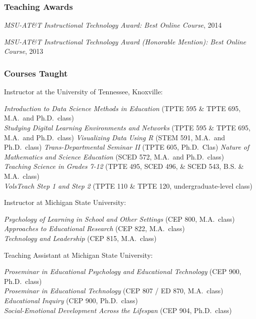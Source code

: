 \documentclass[
  14,
]{article}
\begin{document}
\hypertarget{teaching-awards}{%
\subsubsection{Teaching Awards}\label{teaching-awards}}

\emph{MSU-AT\&T Instructional Technology Award: Best Online Course},
2014

\emph{MSU-AT\&T Instructional Technology Award (Honorable Mention): Best
Online Course}, 2013

\hypertarget{courses-taught}{%
\subsubsection{Courses Taught}\label{courses-taught}}

Instructor at the University of Tennessee, Knoxville:

\emph{Introduction to Data Science Methods in Education} (TPTE 595 \&
TPTE 695, M.A.~and Ph.D.~class)\\
\emph{Studying Digital Learning Environments and Networks} (TPTE 595 \&
TPTE 695, M.A.~and Ph.D.~class) \emph{Visualizing Data Using R} (STEM
591, M.A.~and Ph.D.~class) \emph{Trans-Departmental Seminar II} (TPTE
605, Ph.D.~Clas) \emph{Nature of Mathematics and Science Education}
(SCED 572, M.A.~and Ph.D.~class)\\
\emph{Teaching Science in Grades 7-12} (TPTE 495, SCED 496, \& SCED 543,
B.S. \& M.A.~class)\\
\emph{VolsTeach Step 1 and Step 2} (TPTE 110 \& TPTE 120,
undergraduate-level class)

Instructor at Michigan State University:

\emph{Psychology of Learning in School and Other Settings} (CEP 800,
M.A.~class)\\
\emph{Approaches to Educational Research} (CEP 822, M.A.~class)\\
\emph{Technology and Leadership} (CEP 815, M.A.~class)

Teaching Assistant at Michigan State University:

\emph{Proseminar in Educational Psychology and Educational Technology}
(CEP 900, Ph.D.~class)\\
\emph{Proseminar in Educational Technology} (CEP 807 / ED 870,
M.A.~class)\\
\emph{Educational Inquiry} (CEP 900, Ph.D.~class)\\
\emph{Social-Emotional Development Across the Lifespan} (CEP 904,
Ph.D.~class)
\end{document}
